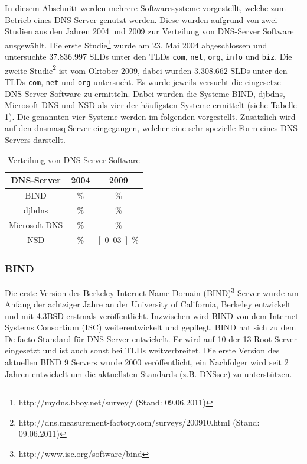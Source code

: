 \documentclass[a4paper, 12pt, BCOR10mm, DIV12, toc=bibliography, toc=listof, german]{scrbook}
\begin{document}
				In diesem Abschnitt werden mehrere Softwaresysteme vorgestellt, welche zum Betrieb eines
				DNS-Server genutzt werden. Diese wurden aufgrund von zwei Studien aus den Jahren 2004 und
				2009 zur Verteilung von DNS-Server Software ausgewählt. Die erste
				Studie\footnote{http://mydns.bboy.net/survey/ (Stand: 09.06.2011)} wurde am 23. Mai 2004
				abgeschlossen und untersuchte 37.836.997 SLDs unter den TLDs \texttt{com}, \texttt{net},
				\texttt{org},	\texttt{info} und \texttt{biz}. Die zweite
				Studie\footnote{http://dns.measurement-factory.com/surveys/200910.html (Stand: 09.06.2011)}
				ist vom Oktober 2009, dabei wurden 3.308.662 SLDs unter den TLDs \texttt{com}, \texttt{net}
				und \texttt{org} untersucht. Es wurde jeweils versucht die eingesetze DNS-Server Software zu
				ermitteln. Dabei wurden die Systeme BIND, djbdns, Microsoft DNS und NSD als vier der
				häufigsten Systeme ermittelt (siehe Tabelle \ref{tab:verteilung}). Die genannten vier
				Systeme werden im folgenden vorgestellt. Zusätzlich wird auf den dnsmasq Server eingegangen,
			welcher eine sehr spezielle Form eines DNS-Servers darstellt.
				
				\begin{table}
					\centering
					\begin{tabular}{|c|c|c|}\hline
						DNS-Server & 2004 & 2009 \\\hline\hline
						BIND & \unit[70,11]{\%} & \unit[73,85]{\%} \\
						djbdns & \unit[15,57]{\%} & \unit[2,56]{\%} \\
						Microsoft DNS & \unit[6,24]{\%} & \unit[0,26]{\%}\\
						NSD & \unit[0,20]{\%} & \unit[0.03]{\%} \\\hline
					\end{tabular}
					\caption{Verteilung von DNS-Server Software}
					\label{tab:verteilung}
				\end{table}

				\subsubsection*{BIND} %

				Die erste Version des Berkeley Internet Name Domain
				(BIND)\footnote{http://www.isc.org/software/bind} Server wurde am Anfang der achtziger Jahre
				an der University of California, Berkeley entwickelt und mit 4.3BSD erstmals
				veröffentlicht. Inzwischen wird BIND von dem Internet Systems Consortium (ISC)
				weiterentwickelt und gepflegt. BIND hat sich zu dem De-facto-Standard für DNS-Server
				entwickelt. Er wird auf 10 der 13 Root-Server eingesetzt und ist auch sonst bei TLDs
				weitverbreitet. Die erste Version des aktuellen BIND 9 Servers wurde 2000 veröffentlicht,
				ein Nachfolger wird seit 2 Jahren entwickelt um die aktuellsten Standards (z.B.  DNSsec) zu
				unterstützen.
\end{document}
